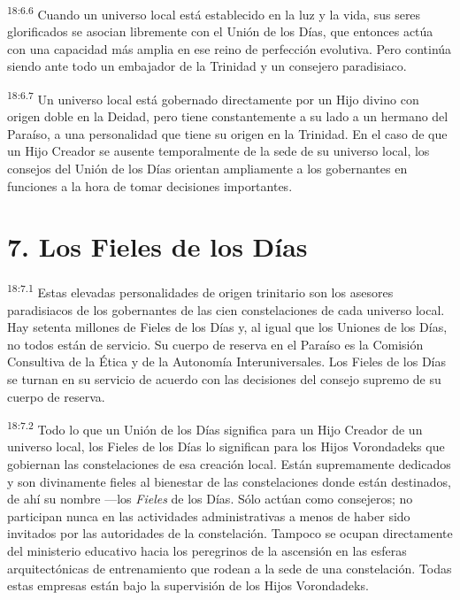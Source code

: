 \par
\textsuperscript{18:6.6} Cuando un universo local está establecido en la luz y la vida, sus seres glorificados se asocian libremente con el Unión de los Días, que entonces actúa con una capacidad más amplia en ese reino de perfección evolutiva. Pero continúa siendo ante todo un embajador de la Trinidad y un consejero paradisiaco.

\par
\textsuperscript{18:6.7} Un universo local está gobernado directamente por un Hijo divino con origen doble en la Deidad, pero tiene constantemente a su lado a un hermano del Paraíso, a una personalidad que tiene su origen en la Trinidad. En el caso de que un Hijo Creador se ausente temporalmente de la sede de su universo local, los consejos del Unión de los Días orientan ampliamente a los gobernantes en funciones a la hora de tomar decisiones importantes.

\section*{7. Los Fieles de los Días}
\par
\textsuperscript{18:7.1} Estas elevadas personalidades de origen trinitario son los asesores paradisiacos de los gobernantes de las cien constelaciones de cada universo local. Hay setenta millones de Fieles de los Días y, al igual que los Uniones de los Días, no todos están de servicio. Su cuerpo de reserva en el Paraíso es la Comisión Consultiva de la Ética y de la Autonomía Interuniversales. Los Fieles de los Días se turnan en su servicio de acuerdo con las decisiones del consejo supremo de su cuerpo de reserva.

\par
\textsuperscript{18:7.2} Todo lo que un Unión de los Días significa para un Hijo Creador de un universo local, los Fieles de los Días lo significan para los Hijos Vorondadeks que gobiernan las constelaciones de esa creación local. Están supremamente dedicados y son divinamente fieles al bienestar de las constelaciones donde están destinados, de ahí su nombre ---los \textit{Fieles} de los Días. Sólo actúan como consejeros; no participan nunca en las actividades administrativas a menos de haber sido invitados por las autoridades de la constelación. Tampoco se ocupan directamente del ministerio educativo hacia los peregrinos de la ascensión en las esferas arquitectónicas de entrenamiento que rodean a la sede de una constelación. Todas estas empresas están bajo la supervisión de los Hijos Vorondadeks.

